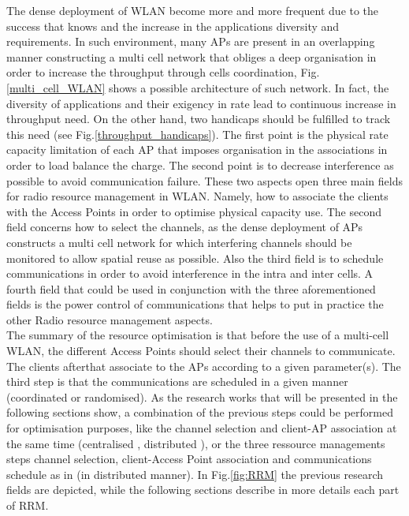\documentclass[journal,transmag]{IEEEtran}
\begin{document}
The dense deployment of WLAN become more and more frequent due to the success that knows and the increase in the applications diversity and requirements. In such environment, many APs are present in an overlapping manner constructing a multi cell network that obliges a deep organisation in order to increase the throughput through cells coordination, Fig.\ref{multi_cell_WLAN} shows a possible architecture of such network. In fact, the diversity of applications and their exigency in rate lead to continuous increase in throughput need. On the other hand, two handicaps should be fulfilled to track this need (see Fig.\ref{throughput_handicaps}). The first point is the physical rate capacity limitation of each AP that imposes organisation in the associations in order to load balance the charge. The second point is to decrease interference as possible to avoid communication failure. These two aspects open three main fields for radio resource management in WLAN. Namely, how to associate the clients with the Access Points in order to optimise physical capacity use. The second field concerns how to select the channels, as the dense deployment of APs constructs a multi cell network for which interfering channels should be monitored to allow spatial reuse as possible. Also the third field is to schedule communications in order to avoid interference in the intra and inter cells. A fourth field that could be used in conjunction with the three aforementioned fields is the power control of communications that helps to put in practice the other Radio resource management aspects. \\
The summary of the resource optimisation is that before the use of a multi-cell WLAN, the different Access Points should select their channels to communicate. The clients afterthat associate to the APs according to a given parameter(s). The third step is that the communications are scheduled in a given manner (coordinated or randomised). As the research works that will be presented in the following sections show, a combination of the previous steps could be performed for optimisation purposes, like the channel selection and client-AP association at the same time (centralised \cite{06client_channel_WLAN}, distributed \cite{07measurment_self_WIFI}), or the three ressource managements steps channel selection, client-Access Point association and communications schedule as in \cite{14proportional_fairness_distributed_multiband} (in distributed manner). In Fig.\ref{fig:RRM} the previous research fields are depicted, while the following sections describe in more details each part of RRM.  
\end{document}
